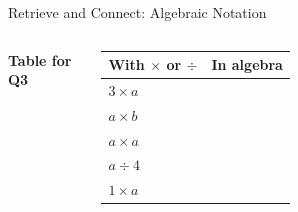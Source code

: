 \documentclass{beamer}
\newcommand{\ablank}[1]{%
  \alt<2>{\textcolor{red}{#1}}{\underline{\phantom{#1}}}%
}
\newcommand{\dheading}[1]{{\scriptsize\bfseries #1}\par\vspace{0.2em}}
\newcommand{\tblank}[1]{\ablank{\makebox[1.6em]{#1}}}
\newcommand{\tgiven}[1]{\makebox[1.6em]{#1}}
\begin{document}
\begin{frame}[t]{Retrieve and Connect: Algebraic Notation}
\hypertarget{q-st1}{}
\begin{columns}[T,onlytextwidth]

\vspace{-0.4em}
\dheading{Table for Q3}
{\footnotesize
\renewcommand{\arraystretch}{1.25}
\begin{tabular}{@{}l|l@{}}
  With $\times$ or $\div$ & In algebra\\ \hline
  $3\times a$ & \tgiven{$3a$}\\
  $a\times b$ & \tblank{$ab$}\\
  $a\times a$ & \tblank{$a^2$}\\
  $a\div4$    & \tblank{$\dfrac{a}{4}$}\\[2pt]
  $1\times a$ & \tblank{$a$}
\end{tabular}}


\end{columns}
\end{frame}
\end{document}
